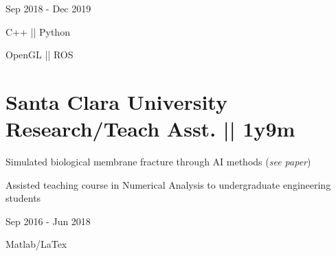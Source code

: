 \begin{subtitle}
\vspace{-10.8ex}
{{Sep 2018 - Dec 2019}} 
\end{subtitle}

\vspace{3ex} 
{\color{cyan}\small {C++ || Python}}

{
\vspace{-2.5ex}\hspace{3.17in} \color{cyan} \small
{OpenGL || ROS} }
\vspace{1ex}




\section
{\textbf{Santa Clara University} \newline
Research/Teach Asst. || 1y9m}{}


\begin{detail}
\vspace{-2.5ex}
\BulletItem
Simulated biological membrane fracture through AI methods (\textit{see paper})

\BulletItem
Assisted teaching course in Numerical Analysis to undergraduate engineering students
\end{detail}

\begin{subtitle}
\vspace{-7.8ex}
{{Sep 2016 - Jun 2018}} 
\end{subtitle}

\vspace{1ex} 
{\color{cyan}\small {Matlab/LaTex}}

\vspace{2ex}
